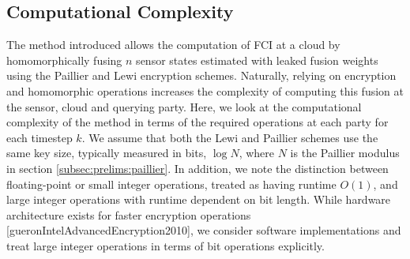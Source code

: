\subsection{Computational Complexity}\label{subsec:cloud_fusion:secfci_comp_complexity}
The method introduced allows the computation of FCI at a cloud by homomorphically fusing $n$ sensor states estimated with leaked fusion weights using the Paillier and Lewi encryption schemes. Naturally, relying on encryption and homomorphic operations increases the complexity of computing this fusion at the sensor, cloud and querying party. Here, we look at the computational complexity of the method in terms of the required operations at each party for each timestep $k$. We assume that both the Lewi and Paillier schemes use the same key size, typically measured in bits, $\log{N}$, where $N$ is the Paillier modulus in section \ref{subsec:prelims:paillier}. In addition, we note the distinction between floating-point or small integer operations, treated as having runtime $O(1)$, and large integer operations with runtime dependent on bit length. While hardware architecture exists for faster encryption operations [gueronIntelAdvancedEncryption2010], we consider software implementations and treat large integer operations in terms of bit operations explicitly.

